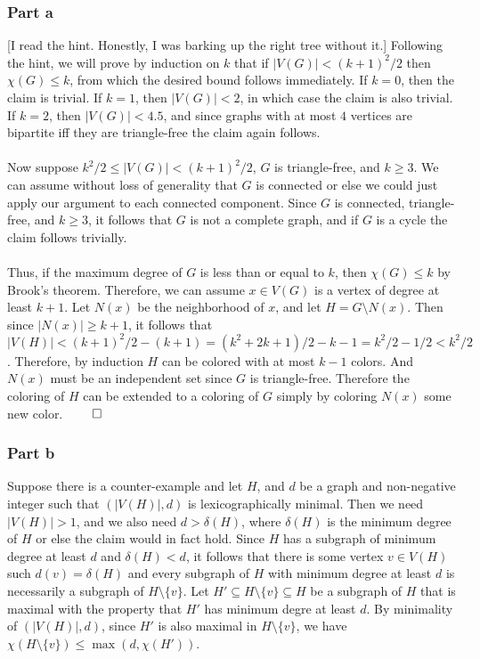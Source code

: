 \documentclass[10pt,a4paper]{article}
\newcommand{\1}{\mathbf{1}}
\begin{document}
\subsubsection*{Part a}
[I read the hint.  Honestly, I was barking up the right tree without it.] Following the hint, we will prove by induction on $k$ that if $|V(G)| < (k+1) ^2 / 2$ then $\chi(G) \leq k$, from which the desired bound follows immediately.  If $k=0$, then the claim is trivial.  If $k=1$, then $|V(G)| < 2$, in which case the claim is also trivial.  If $k=2$, then $|V(G)| < 4.5$, and since graphs with at most $4$ vertices are bipartite iff they are triangle-free the claim again follows.
\paragraph*{}Now suppose $k^2 / 2 \leq |V(G)| < (k+1)^2 / 2$, $G$ is triangle-free, and $k \geq 3$.  We can assume without loss of generality that $G$ is connected or else we could just apply our argument to each connected component.  Since $G$ is connected, triangle-free, and $k \geq 3$, it follows that $G$ is not a complete graph, and if $G$ is a cycle the claim follows trivially.
\paragraph*{}Thus, if the maximum degree of $G$ is less than or equal to $k$, then $\chi(G) \leq k$ by Brook's theorem.  Therefore, we can assume $x \in V(G)$ is a vertex of degree at least $k+1$.  Let $N(x)$ be the neighborhood of $x$, and let $H = G \setminus N(x)$.  Then since $|N(x)| \geq k+1$, it follows that $|V(H)| < (k+1)^2 / 2 - (k+1) = (k^2 + 2k +1) /2 -k-1 = k^2 / 2 - 1/2 < k^2 / 2$.  Therefore, by induction $H$ can be colored with at most $k-1$ colors.  And $N(x)$ must be an independent set since $G$ is triangle-free.  Therefore the coloring of $H$ can be extended to a coloring of $G$ simply by coloring $N(x)$ some new color. $\qed$

\subsubsection*{Part b}
Suppose there is a counter-example and let $H$, and $d$ be a graph and non-negative integer such that $(|V(H)|, d)$ is lexicographically minimal.  Then we need $|V(H)| > 1$, and we also need $d > \delta(H)$, where $\delta(H)$ is the minimum degree of $H$ or else the claim would in fact hold.  Since $H$ has a subgraph of minimum degree at least $d$ and $\delta(H) < d$, it follows that there is some vertex $v \in V(H)$ such $d(v) = \delta(H)$ and every subgraph of $H$ with minimum degree at least $d$ is necessarily a subgraph of $H \setminus \{v\}$.  Let $H' \subseteq H \setminus \{v\} \subseteq H$ be a subgraph of $H$ that is maximal with the property that $H'$ has minimum degre at least $d$.  By minimality of $(|V(H)|, d)$, since $H'$ is also maximal in $H \setminus \{v\}$, we have $\chi(H \setminus \{v\}) \leq \max(d, \chi(H'))$.
\end{document}
